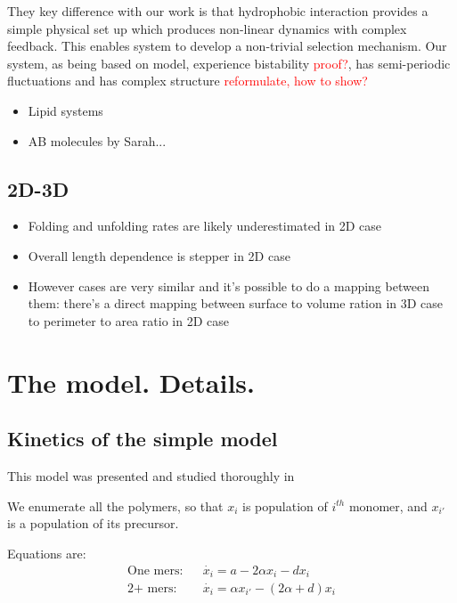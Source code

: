 \documentclass[journal=jacsat,manuscript=article,layout=twocolumn]{achemso}
\newcommand*{\ga}{\alpha}
\newcommand*{\red}[1]{\textcolor{red}{#1}}
\begin{document}
They key difference with our work is 
that hydrophobic interaction provides a simple physical set up which produces non-linear dynamics with complex feedback.
This enables system to develop a non-trivial selection mechanism. Our system, as being based on 
\cite{Ohtsuki2009} model, experience bistability \red{proof?}, has semi-periodic fluctuations  and 
has complex structure \red{reformulate, how to show?}
\begin{itemize}
 \item Lipid systems
 \item AB molecules by Sarah...
\end{itemize}



\subsection{2D-3D}
\begin{itemize}
 \item Folding and unfolding rates are likely underestimated in 2D case
 \item Overall length dependence is stepper in 2D case
 \item However cases are very similar and it's possible to do a mapping between them: there's a 
direct mapping between surface to volume ration in 3D case to perimeter to area ratio in 2D case
\end{itemize}


 \newpage
\appendix


\section{The model. Details.}
\subsection{Kinetics of the simple model}
This model was presented and studied thoroughly in 
\cite{nowak2008prevolutionary,Ohtsuki2009,Chen2012}

We enumerate all the polymers, so that $x_i$ is population of $i^{th}$ monomer, and $x_{i'}$ is a 
population of its precursor.

Equations are:
  \begin{eqnarray}
   \mbox{One mers:}&& \dot{x_i}=a-2\ga x_i-dx_i \\
     \mbox{2+ mers:}&& \dot{x_i}=\ga x_{i'}-(2\ga+d)x_i
  \end{eqnarray}
\end{document}
